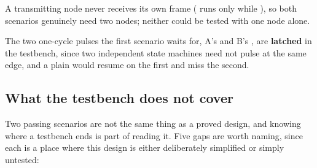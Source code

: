 A transmitting node never receives its own frame ( runs only while
), so both scenarios genuinely need two nodes; neither could be tested with one node
alone.

The two one-cycle pulses the first scenario waits for, A's  and B's , are
\textbf{latched} in the testbench, since two independent state machines need not pulse at the same
edge, and a plain  would resume on the first and miss the
second.

\subsection*{What the testbench does not cover}
\label{c19:sub:gaps-tb}

Two passing scenarios are not the same thing as a proved design, and knowing where a testbench ends is
part of reading it. Five gaps are worth naming, since each is a place where this design is either
deliberately simplified or simply untested:
